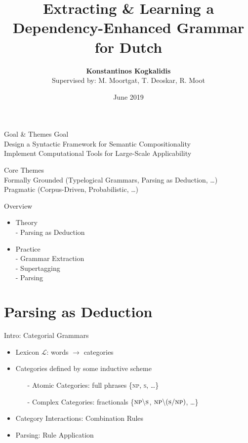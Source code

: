 \documentclass{beamer}
\title{Extracting \& Learning a Dependency-Enhanced Grammar for Dutch}
\author{\textbf{Konstantinos Kogkalidis} \\
		\footnotesize \quad Supervised by: M. Moortgat, T. Deoskar, R. Moot \\}
\institute{Utrecht University}
\date{June 2019}
\begin{document}
\maketitle

\begin{frame}{Goal \& Themes}
\alert{Goal}\\
\small{
Design a Syntactic Framework for Semantic Compositionality\\
Implement Computational Tools for Large-Scale Applicability\\}
\vfill

\alert{Core Themes}\\
\small{Formally Grounded} (Typelogical Grammars, Parsing as Deduction, \dots)\\
\small {Pragmatic (Corpus-Driven, Probabilistic, \dots) \\}
\end{frame}


\begin{frame}{Overview}
\begin{itemize}
\item Theory \\
\quad - Parsing as Deduction
\item Practice \\
\quad - Grammar Extraction \\
\quad - Supertagging \\
\quad - Parsing \\
\end{itemize}
\end{frame}

\section{Parsing as Deduction}

\begin{frame}{Intro: Categorial Grammars}
\begin{itemize}
\item Lexicon $\mathcal{L}$: words $\to$ categories
\item Categories defined by some inductive scheme
\begin{itemize}
\item[-] Atomic Categories: full phrases \{\textsc{np}, \textsc{s}, \dots\}
\item[-] Complex Categories: fractionals \{$\textsc{np}\backslash \textsc{s}$, $\textsc{np}\backslash (\textsc{s}/\textsc{np})$, \dots\}
\end{itemize}
\item Category Interactions: Combination Rules
\item Parsing: Rule Application
\end{itemize}
\end{frame}
\end{document}
